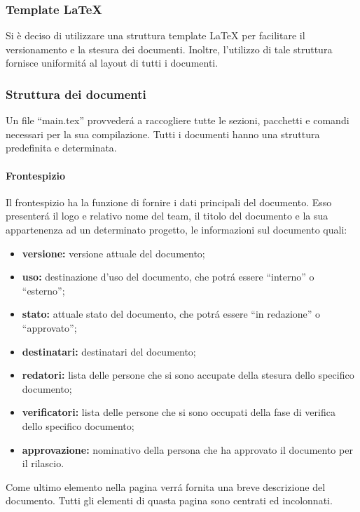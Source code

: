 		\subsubsection{Template LaTeX}
			Si è deciso di utilizzare una struttura template \LaTeX{} per facilitare il versionamento e la stesura dei documenti. Inoltre, l'utilizzo di tale struttura fornisce uniformitá al layout di tutti i documenti.
		\subsubsection{Struttura dei documenti}
			Un file ``main.tex'' provvederá a raccogliere tutte le sezioni, pacchetti e comandi necessari per la sua compilazione. Tutti i documenti hanno una struttura predefinita e determinata.
			\paragraph{Frontespizio}
				Il frontespizio ha la funzione di fornire i dati principali del documento. Esso presenterá il logo e relativo nome del team, il titolo del documento e la sua appartenenza ad un determinato progetto, le informazioni sul documento quali:
				\begin{itemize}
					\item \textbf{versione:} versione attuale del documento;
					\item \textbf{uso:} destinazione d'uso del documento, che potrá essere ``interno'' o ``esterno'';
					\item \textbf{stato:} attuale stato del documento, che potrá essere ``in redazione'' o ``approvato'';
					\item \textbf{destinatari:} destinatari del documento;
					\item \textbf{redatori:} lista delle persone che si sono accupate della stesura dello specifico documento;
					\item \textbf{verificatori:} lista delle persone che si sono occupati della fase di verifica dello specifico documento;
					\item \textbf{approvazione:} nominativo della persona che ha approvato il documento per il rilascio.
				\end{itemize}
				Come ultimo elemento nella pagina verrá fornita una breve descrizione del documento. Tutti gli elementi di quasta pagina sono centrati ed incolonnati.
